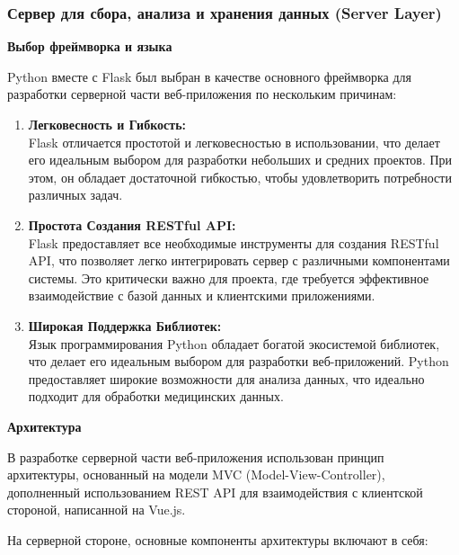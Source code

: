 \documentclass[12pt, russian]{extarticle}
\begin{document}
\begin{spacing}{1.5}
\subsubsection{Сервер для сбора, анализа и хранения данных (Server Layer)}

\par \noindent \textbf{Выбор фреймворка и языка}

Python вместе с Flask был выбран в качестве основного фреймворка для разработки серверной части веб-приложения по нескольким причинам:

\begin{enumerate}
    \item \textbf{Легковесность и Гибкость:} \\
        Flask отличается простотой и легковесностью в использовании, что делает его идеальным выбором для разработки небольших и средних проектов. При этом, он обладает достаточной гибкостью, чтобы удовлетворить потребности различных задач.
    \item \textbf{Простота Создания RESTful API:} \\
        Flask предоставляет все необходимые инструменты для создания RESTful API, что позволяет легко интегрировать сервер с различными компонентами системы. Это критически важно для проекта, где требуется эффективное взаимодействие с базой данных и клиентскими приложениями.
    \item \textbf{Широкая Поддержка Библиотек:} \\
        Язык программирования Python обладает богатой экосистемой библиотек, что делает его идеальным выбором для разработки веб-приложений. Python предоставляет широкие возможности для анализа данных, что идеально подходит для обработки медицинских данных.
\end{enumerate}

\par \noindent \textbf{Архитектура}

В разработке серверной части веб-приложения использован принцип архитектуры, основанный на модели MVC (Model-View-Controller), дополненный использованием REST API для взаимодействия с клиентской стороной, написанной на Vue.js.

На серверной стороне, основные компоненты архитектуры включают в себя:


\end{spacing}
\end{document}

